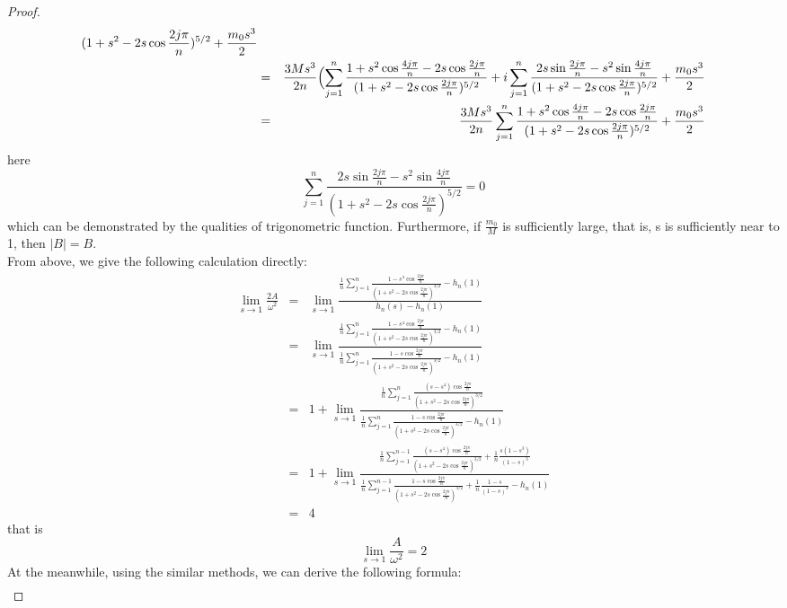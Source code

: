 \documentclass[11pt]{article}
\begin{document}
\begin{proof}
\begin{eqnarray*}
   {(1+s^2-2s\cos{\frac{2j\pi}{n}})^{5/2}}+\frac{m_0s^3}{2}\\
   &=&\frac{3Ms^3}{2n}
   \Bigl(
   \sum_{j=1}^{n}
   \frac{1+s^2\cos{\frac{4j\pi}{n}}-2s\cos{\frac{2j\pi}{n}}}
   {(1+s^2-2s\cos{\frac{2j\pi}{n}})^{5/2}}
   +i
   \sum_{j=1}^{n}
   \frac{2s\sin{\frac{2j\pi}{n}}-s^2\sin{\frac{4j\pi}{n}}}
   {(1+s^2-2s\cos{\frac{2j\pi}{n}})^{5/2}}
   +\frac{m_0s^3}{2}\\
   &=&\frac{3Ms^3}{2n}
   \sum_{j=1}^{n}
   \frac{1+s^2\cos{\frac{4j\pi}{n}}-2s\cos{\frac{2j\pi}{n}}}
   {(1+s^2-2s\cos{\frac{2j\pi}{n}})^{5/2}}
   +\frac{m_0s^3}{2}
    \end{eqnarray*}
     here
   $$
    \sum_{j=1}^{n}
   \frac{2s\sin{\frac{2j\pi}{n}}-s^2\sin{\frac{4j\pi}{n}}}
   {(1+s^2-2s\cos{\frac{2j\pi}{n}})^{5/2}}=0
   $$
   which can be demonstrated by the qualities of trigonometric function.
   Furthermore, if $\frac{m_0}{M}$ is sufficiently large, that is, s is sufficiently near to 1, then 
   $|B|=B$.
   \\
   From above, we give the following calculation directly:
\begin{eqnarray*}
    \lim_{s\to 1}\frac{2A}{\omega^2}&=&\lim_{s\to 1}\frac{\frac{1}{n}\sum_{j=1}^{n}\frac{1-s^4\cos{\frac{2j\pi}{n}}}{(1+s^2-2s\cos{\frac{2j\pi}{n}})^{3/2}}-h_n(1)}
    {h_n(s)-h_n(1)}\\
    &=&\lim_{s\to 1}
    \frac{
    \frac{1}{n}\sum_{j=1}^{n}\frac{1-s^4\cos{\frac{2j\pi}{n}}}{(1+s^2-2s\cos{\frac{2j\pi}{n}})^{3/2}}-h_n(1)
    }
    {
    \frac{1}{n}\sum_{j=1}^{n}\frac{1-s\cos{\frac{2j\pi}{n}}}{(1+s^2-2s\cos{\frac{2j\pi}{n}})^{3/2}}
    -h_n(1)
    }\\
   &=&1+\lim_{s\to 1}\frac{
    \frac{1}{n}\sum_{j=1}^{n}\frac{(s-s^4)\cos{\frac{2j\pi}{n}}}{(1+s^2-2s\cos{\frac{2j\pi}{n}})^{3/2}}
   }
   {
    \frac{1}{n}\sum_{j=1}^{n}\frac{1-s\cos{\frac{2j\pi}{n}}}{(1+s^2-2s\cos{\frac{2j\pi}{n}})^{3/2}}
    -h_n(1)
   }\\
   &=&1+\lim_{s\to 1}\frac{
    \frac{1}{n}\sum_{j=1}^{n-1}\frac{(s-s^4)\cos{\frac{2j\pi}{n}}}{(1+s^2-2s\cos{\frac{2j\pi}{n}})^{3/2}}
   +\frac{1}{n}\frac{s(1-s^3)}{(1-s)^3}
   }
   {
    \frac{1}{n}\sum_{j=1}^{n-1}\frac{1-s\cos{\frac{2j\pi}{n}}}{(1+s^2-2s\cos{\frac{2j\pi}{n}})^{3/2}}
    +\frac{1}{n}\frac{1-s}{(1-s)^3}
    -h_n(1)
   }\\
   &=&4
\end{eqnarray*}
that is 
$$
\lim_{s\to1}\frac{A}{\omega^2}=2
$$
At the meanwhile, using the similar methods, we can derive the following formula:
   \begin{eqnarray*}

\end{eqnarray*}
\end{proof}
\end{document}
